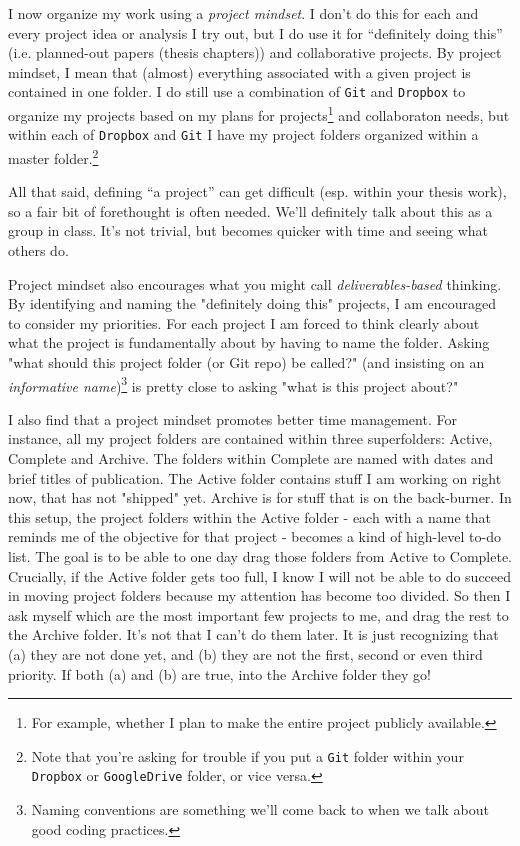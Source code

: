 \documentclass[12pt,letterpaper]{article}
\begin{document}
I now organize my work using a \emph{project mindset}.  I don't do this for each and every project idea or analysis I try out, but I do use it for ``definitely doing this'' (i.e.  planned-out papers (thesis chapters)) and collaborative projects.
By project mindset, I mean that (almost) everything associated with a given project is contained in one folder.
I do still use a combination of \texttt{Git} and \texttt{Dropbox} to organize my projects based on my plans for projects\footnote{For example, whether I plan to make the entire project publicly available.} and collaboraton needs, but within each of \texttt{Dropbox} and \texttt{Git} I have my project folders organized within a master folder.\footnote{Note that you're asking for trouble if you put a \texttt{Git} folder within your \texttt{Dropbox} or \texttt{GoogleDrive} folder, or vice versa.}

All that said, defining ``a project'' can get difficult (esp. within your thesis work), so a fair bit of forethought is often needed.
We'll definitely talk about this as a group in class. It's not trivial, but becomes quicker with time and seeing what others do.

Project mindset also encourages what you might call \emph{deliverables-based} thinking. By identifying and naming the "definitely doing this" projects, I am encouraged to consider my priorities. For each project I am forced to think clearly about what the project is fundamentally about by having to name the folder. Asking "what should this project folder (or Git repo) be called?" (and insisting on an \emph{informative name})\footnote{Naming conventions are something we'll come back to when we talk about good coding practices.} is pretty close to asking "what is this project about?"
		
I also find that a project mindset promotes better time management. For instance, all my project folders are contained within three superfolders: Active, Complete and Archive. The folders within Complete are named with dates and brief titles of publication. The Active folder contains stuff I am working on right now, that has not "shipped" yet. Archive is for stuff that is on the back-burner. In this setup, the project folders within the Active folder - each with a name that reminds me of the objective for that project - becomes a kind of high-level to-do list. The goal is to be able to one day drag those folders from Active to Complete. Crucially, if the Active folder gets too full, I know I will not be able to do succeed in moving project folders because my attention has become too divided. So then I ask myself which are the most important few projects to me, and drag the rest to the Archive folder. It's not that I can't do them later. It is just recognizing that (a) they are not done yet, and (b) they are not the first, second or even third priority. If both (a) and (b) are true, into the Archive folder they go!
	
\end{document}
